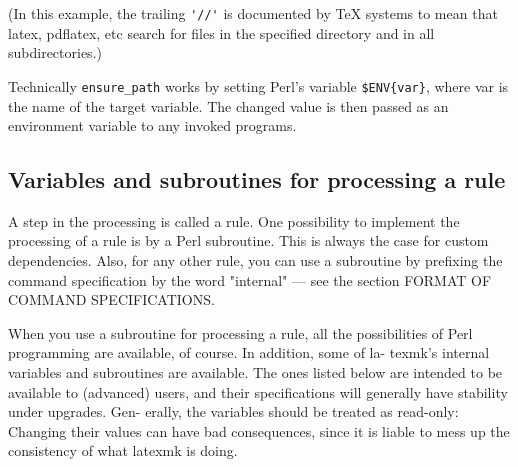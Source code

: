 (In this example, the trailing \verb|'//'| is documented by TeX systems to mean
that latex, pdflatex, etc search for files in the specified directory and in
all subdirectories.)

Technically   \verb|ensure_path|   works  by  setting  Perl's  variable
\verb|$ENV{var}|, where var is the name of the  target  variable.   The
changed  value  is then passed as an environment variable to any
invoked programs.


\subsection{Variables and subroutines for processing a rule}

A step in the processing is called a rule. One possibility to implement
the  processing  of a rule is by a Perl subroutine.  This is always the
case for custom dependencies. Also, for any other rule, you can  use  a
subroutine  by  prefixing the command specification by the word "internal" 
--- see the section FORMAT OF COMMAND SPECIFICATIONS.

When you use a subroutine for processing a rule, all the  possibilities
of Perl programming are available, of course.  In addition, some of la-
texmk's internal variables and subroutines  are  available.   The  ones
listed  below  are  intended  to  be available to (advanced) users, and
their specifications will generally have stability under upgrades. Gen-
erally,  the  variables  should be treated as read-only: Changing their
values can have bad consequences, since it is liable  to  mess  up  the
consistency of what latexmk is doing.

